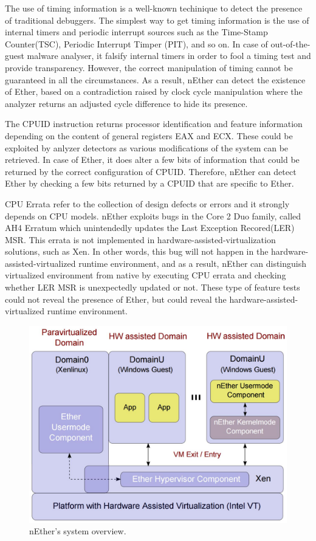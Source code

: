 The use of timing information is a well-known techinique to detect the presence of traditional debuggers. The simplest way to get timing information is the use of internal timers and periodic interrupt sources such as the Time-Stamp Counter(TSC), Periodic Interrupt Timper (PIT), and so on. In case of out-of-the-guest malware analyser, it falsify internal timers in order to fool a timing test and provide transparency. However, the correct manipulation of timing cannot be guaranteed in all the circumstances. As a result, nEther can detect the existence of Ether, based on a contradiction raised by clock cycle manipulation where the analyzer returns an adjusted cycle difference to hide its presence.

The CPUID instruction returns processor identification and feature information depending on the content of general registers EAX and ECX. These could be exploited by anlyzer detectors as various modifications of the system can be retrieved. In case of Ether, it does alter a few bits of information that could be returned by the correct configuration of CPUID. Therefore, nEther can detect Ether by checking a few bits returned by a CPUID that are specific to Ether.

CPU Errata refer to the collection of design defects or errors and it strongly depends on CPU models. nEther exploits bugs in the Core 2 Duo family, called AH4 Erratum which unintendedly updates the Last Exception Recored(LER) MSR. This errata is not implemented in hardware-assisted-virtualization solutions, such as Xen. In other words, this bug will not happen in the hardware-assisted-virtualized runtime environment, and as a result, nEther can distinguish virtualized environment from native by executing CPU errata and checking whether LER MSR is unexpectedly updated or not. These type of feature tests could not reveal the presence of Ether, but could reveal the hardware-assisted-virtualized runtime environment. 

\begin{figure}[!h]
	\centering
	\includegraphics[width=\linewidth]{figure/nether.png}
	\caption{nEther's system overview.}
	\label{fig:nether}
\end{figure}

